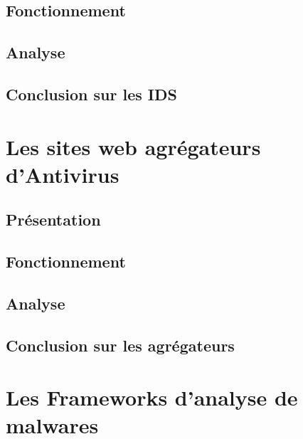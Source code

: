\documentclass[smallextended]{svjour3}       %
\begin{document}
\subsection{Fonctionnement}
\label{ids:fonctionnement}

\subsection{Analyse}
\label{ids:analyse}

\subsection{Conclusion sur les IDS}
\label{ids:conclusion}

\newpage
\section{Les sites web agrégateurs d'Antivirus}
\label{sec2:agrégateurs}

\subsection{Présentation}
\label{agrégateurs:présentation}

\subsection{Fonctionnement}
\label{agrégateurs:fonctionnement}

\subsection{Analyse}
\label{agrégateurs:analyse}

\subsection{Conclusion sur les agrégateurs}
\label{agrégateurs:conclusion}

\newpage
\section{Les Frameworks d'analyse de malwares}
\label{sec3:frameworks}
\end{document}
